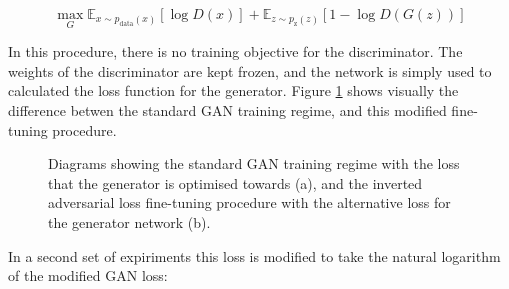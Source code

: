 \begin{equation} 
  \max_{G}\mathbb{E}_{x\sim p_{\text{data}}(x)}[\log{D(x)}] +  \mathbb{E}_{z\sim p_{\text{z}}(z)}[1 - \log{D(G(z))}]
  \label{eq:inverted-adv-loss}
  \end{equation}

In this procedure, there is no training objective for the discriminator. 
The weights of the discriminator are kept frozen, and the network is simply used to calculated the loss function for the generator.
Figure \ref{fig:c4:gan-diagrams} shows visually the difference betwen the standard GAN training regime, and this modified fine-tuning procedure. 

\begin{figure}[!htbp]
  \centering
  \hfill
  \caption[Adversarial and inverted adversarial loss diagram]{Diagrams showing the standard GAN training regime with the loss that the generator is optimised towards (a), and the inverted adversarial loss fine-tuning procedure with the alternative loss for the generator network (b).}
  \label{fig:c4:gan-diagrams}
\end{figure}

In a second set of expiriments this loss is modified to take the natural logarithm of the modified GAN loss:

